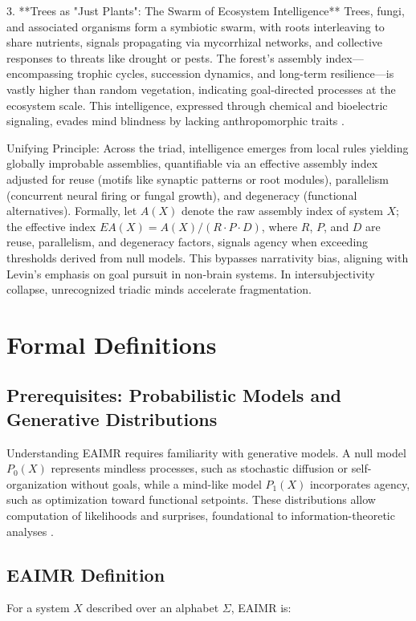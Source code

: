 \documentclass{article}
\begin{document}
3. **Trees as "Just Plants": The Swarm of Ecosystem Intelligence**  
   Trees, fungi, and associated organisms form a symbiotic swarm, with roots interleaving to share nutrients, signals propagating via mycorrhizal networks, and collective responses to threats like drought or pests. The forest's assembly index—encompassing trophic cycles, succession dynamics, and long-term resilience—is vastly higher than random vegetation, indicating goal-directed processes at the ecosystem scale. This intelligence, expressed through chemical and bioelectric signaling, evades mind blindness by lacking anthropomorphic traits \citep{levin2019}.

Unifying Principle: Across the triad, intelligence emerges from local rules yielding globally improbable assemblies, quantifiable via an effective assembly index adjusted for reuse (motifs like synaptic patterns or root modules), parallelism (concurrent neural firing or fungal growth), and degeneracy (functional alternatives). Formally, let \(A(X)\) denote the raw assembly index of system \(X\); the effective index \(EA(X) = A(X) / (R \cdot P \cdot D)\), where \(R\), \(P\), and \(D\) are reuse, parallelism, and degeneracy factors, signals agency when exceeding thresholds derived from null models. This bypasses narrativity bias, aligning with Levin's emphasis on goal pursuit in non-brain systems. In intersubjectivity collapse, unrecognized triadic minds accelerate fragmentation.

\section{Formal Definitions}
\label{sec:formal}

\subsection{Prerequisites: Probabilistic Models and Generative Distributions}
Understanding EAIMR requires familiarity with generative models. A null model \(P_0(X)\) represents mindless processes, such as stochastic diffusion or self-organization without goals, while a mind-like model \(P_1(X)\) incorporates agency, such as optimization toward functional setpoints. These distributions allow computation of likelihoods and surprises, foundational to information-theoretic analyses \citep{cover2006}.

\subsection{EAIMR Definition}
For a system \(X\) described over an alphabet \(\Sigma\), EAIMR is:
\end{document}
